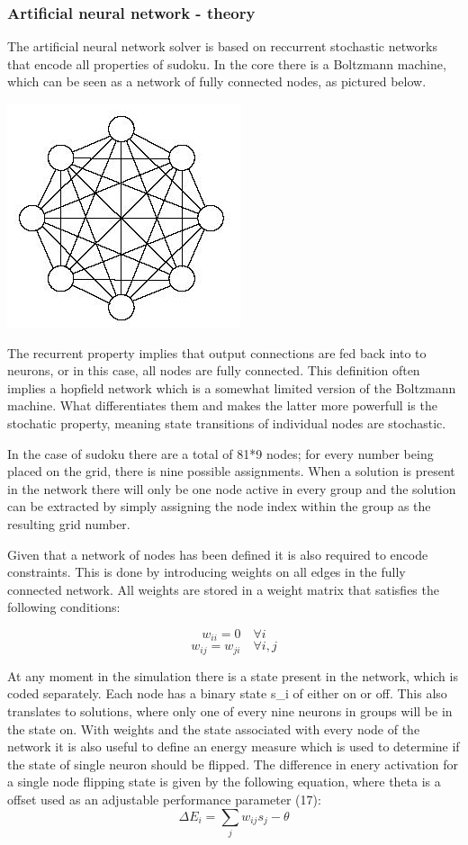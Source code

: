 \documentclass[a4paper,11pt]{kth-mag}
\begin{document}
\subsubsection{Artificial neural network - theory}
The artificial neural network solver is based on reccurrent stochastic networks that encode all properties of sudoku. In the core there is a Boltzmann machine, which can be seen as a network of fully connected nodes, as pictured below.

\includegraphics{images/neural1.png}

The recurrent property implies that output connections are fed back into to neurons, or in this case, all nodes are fully connected.
This definition often implies a hopfield network which is a somewhat limited version of the Boltzmann machine.
What differentiates them and makes the latter more powerfull is the stochatic property, meaning state transitions of individual nodes are stochastic.

In the case of sudoku there are a total of 81*9 nodes; for every number being placed on the grid, there is nine possible assignments.
When a solution is present in the network there will only be one node active in every group and the solution can be extracted by simply assigning the node index within the group as the resulting grid number.

Given that a network of nodes has been defined it is also required to encode constraints.
This is done by introducing weights on all edges in the fully connected network.
All weights are stored in a weight matrix that satisfies the following conditions:

\[
w_{ii} = 0 \quad \forall i
\]
\[
w_{ij} = w_{ji} \quad \forall i,j
\]

At any moment in the simulation there is a state present in the network, which is coded separately.
Each node has a binary state s\_i of either on or off.
This also translates to solutions, where only one of every nine neurons in groups will be in the state on.
With weights and the state associated with every node of the network it is also useful to define an energy measure which is used to determine if the state of single neuron should be flipped.
The difference in enery activation for a single node flipping state is given by the following equation, where theta is a offset used as an adjustable performance parameter (17):
\[
\Delta E_{i} = \sum_{j} w_{ij} s_{j} - \theta
\]
\end{document}
